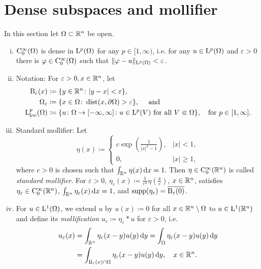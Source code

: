 \section{Dense subspaces and mollifier}
\label{sec:mollifier}

In this section let $\Omega \subset \mathbb{R}^n$ be open.
\begin{enumerate}[i)]
  \item $\mathrm{C}_0^\infty(\Omega)$ is dense in $\mathrm{L}^p(\Omega)$ for any $p \in [1,\infty)$, i.e. for any $u \in \mathrm{L}^p(\Omega)$ and $\varepsilon > 0$ there is $\varphi \in \mathrm{C}_0^\infty(\Omega)$ such that $\|\varphi - u\|_{\mathrm{L}^p(\Omega)} < \varepsilon$.
    \item Notation: For $\varepsilon > 0, x \in \mathbb{R}^n$, let 
      \begin{align*}
        \mathrm{B}_\varepsilon(x) &\coloneqq \{ y \in \mathbb{R}^n \colon |y - x| < \varepsilon \}, \\
        \Omega_\varepsilon &\coloneqq \{ x \in \Omega \colon \operatorname{dist}(x, \partial\Omega) > \varepsilon \}, \quad\text{ and } \\
        \mathrm{L}_{\operatorname{loc}}^p(\Omega) &\coloneqq \{ u \colon \Omega \to [-\infty, \infty] \colon u \in \mathrm{L}^p(V) \text{ for all } V \Subset \Omega \}, \quad\text{for $p \in [1,\infty]$.}
    \end{align*}
  \item Standard mollifier: Let
    $$
    \eta(x) \coloneqq \begin{cases} c \exp\left( \frac{1}{|x|^2 - 1} \right), &|x| < 1, \\ 0, &|x| \geq 1, \end{cases}
    $$
    where $c > 0$ is chosen such that $\int_{\mathbb{R}^n} \eta(x) \, {\operatorname{d}\!{x}} = 1$.
    Then $\eta \in \mathrm{C}_0^\infty(\mathbb{R}^n)$ is called \emph{standard mollifier}.
    For $\varepsilon > 0$,
    $ \eta_\varepsilon(x) \coloneqq \frac{1}{\varepsilon^n} \eta \left(\frac{x}{\varepsilon} \right)$, $x \in \mathbb{R}^n$,
    satisfies $\eta_\varepsilon \in \mathrm{C}_0^\infty(\mathbb{R}^n)$, $\int_{\mathbb{R}^n} \eta_\varepsilon(x) \, {\operatorname{d}\!{x}} = 1$, and $\operatorname{supp}(\eta_\varepsilon) = \overline{\mathrm{B}_\varepsilon(0)}$.
  \item For $u \in \mathrm{L}^1(\Omega)$, we extend $u$ by $u(x) \coloneqq 0$ for all $x \in \mathbb{R}^n \setminus \Omega$ to $u \in \mathrm{L}^1(\mathbb{R}^n)$ and define its \emph{mollification} $u_\varepsilon \coloneqq \eta_\varepsilon \ast u$ for $\varepsilon > 0$, i.e.
  \begin{align*}
    u_\varepsilon(x) 
    &= \int_{\mathbb{R}^n} \eta_\varepsilon(x - y) u(y) \, {\operatorname{d}\!{y}}
    = \int_{\Omega} \eta_\varepsilon(x - y) u(y) \, {\operatorname{d}\!{y}} \\
    &= \int_{\mathrm{B}_\varepsilon(x) \cap \Omega} \eta_\varepsilon(x - y) u(y) \, {\operatorname{d}\!{y}}, \quad x \in \mathbb{R}^n.
  \end{align*}
\end{enumerate}
